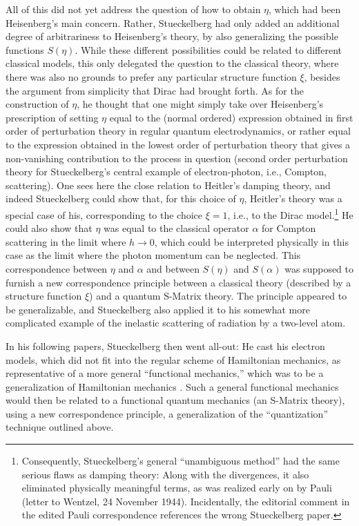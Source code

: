 \documentclass[12pt,a4paper]{article}
\begin{document}
All of this did not yet address the question of how to obtain $\eta$, which had been Heisenberg's main concern. Rather, Stueckelberg had only added an additional degree of arbitrariness to Heisenberg's theory, by also generalizing the possible functions $S(\eta)$. While these different possibilities could be related to different classical models, this only delegated the question to the classical theory, where there was also no grounds to prefer any particular structure function $\xi$, besides the argument from simplicity that Dirac had brought forth. As for the construction of $\eta$, he thought that one might simply take over Heisenberg's prescription of setting $\eta$ equal to the (normal ordered) expression obtained in first order of perturbation theory in regular quantum electrodynamics, or rather equal to the expression obtained in the lowest order of perturbation theory that gives a non-vanishing contribution to the process in question (second order perturbation theory for Stueckelberg's central example of electron-photon, i.e., Compton, scattering). One sees here the close relation to Heitler's damping theory, and indeed Stueckelberg could show that, for this choice of $\eta$, Heitler's theory was a special case of his, corresponding to the choice $\xi = 1$, i.e., to the Dirac model.\footnote{Consequently, Stueckelberg's general ``unambiguous method'' had the same serious flaws as damping theory: Along with the divergences, it also eliminated physically meaningful terms, as was realized early on by Pauli (letter to Wentzel, 24 November 1944). Incidentally, the editorial comment in the edited Pauli correspondence references the wrong Stueckelberg paper.} He could also show that $\eta$ was equal to the classical operator $\alpha$ for Compton scattering in the limit where $h \rightarrow 0$, which could be interpreted physically in this case as the limit where the photon momentum can be neglected. This correspondence between $\eta$ and $\alpha$ and between $S(\eta)$ and $S(\alpha)$ was supposed to furnish a new correspondence principle between a classical theory (described by a structure function $\xi$) and a quantum S-Matrix theory. The principle appeared to be generalizable, and Stueckelberg also applied it to his somewhat more complicated example of the inelastic scattering of radiation by a two-level atom.

In his following papers, Stueckelberg then went all-out: He cast his electron models, which did not fit into the regular scheme of Hamiltonian mechanics, as representative of a more general ``functional mechanics,'' which was to be a generalization of Hamiltonian mechanics \citep{stueckelberg_1945_mecanique}. Such a general functional mechanics would then be related to a functional quantum mechanics (an S-Matrix theory), using a new correspondence principle, a generalization of the ``quantization'' technique outlined above.
\end{document}
